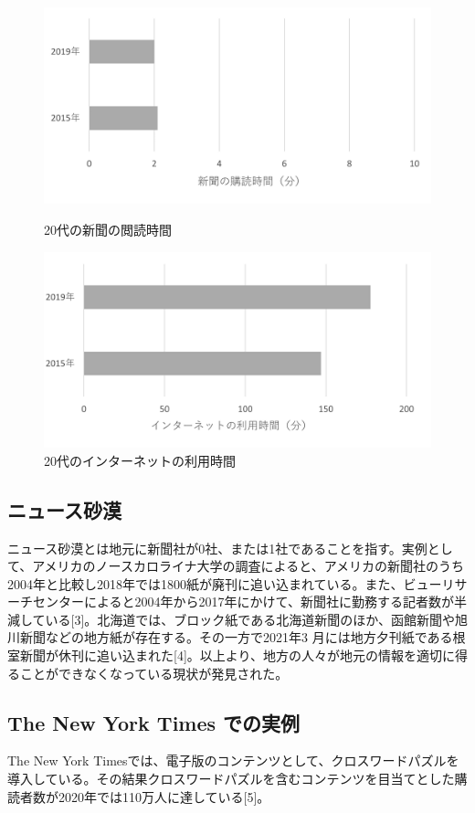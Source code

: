 \begin{figure}[htbp]
    \begin{minipage}[b]{0.45\linewidth}
        \centering
        \includegraphics[keepaspectratio, scale=0.75]{images/newspaper3.png}
        \caption{20代の新聞の閲読時間 }
    \end{minipage}
    \begin{minipage}[b]{0.45\linewidth}
        \centering
        \includegraphics[keepaspectratio, scale=0.75]{images/newspaper2.png}
        \caption{20代のインターネットの利用時間}
    \end{minipage}
\end{figure}

\subsection{ニュース砂漠}
ニュース砂漠とは地元に新聞社が0社、または1社であることを指す。実例として、アメリカのノースカロライナ大学の調査によると、アメリカの新聞社のうち2004年と比較し2018年では1800紙が廃刊に追い込まれている。また、ビューリサーチセンターによると2004年から2017年にかけて、新聞社に勤務する記者数が半減している[3]。北海道では、ブロック紙である北海道新聞のほか、函館新聞や旭川新聞などの地方紙が存在する。その一方で2021年3 月には地方夕刊紙である根室新聞が休刊に追い込まれた[4]。以上より、地方の人々が地元の情報を適切に得ることができなくなっている現状が発見された。

\subsection{The New York Times での実例}
The New York Timesでは、電子版のコンテンツとして、クロスワードパズルを導入している。その結果クロスワードパズルを含むコンテンツを目当てとした購読者数が2020年では110万人に達している[5]。

